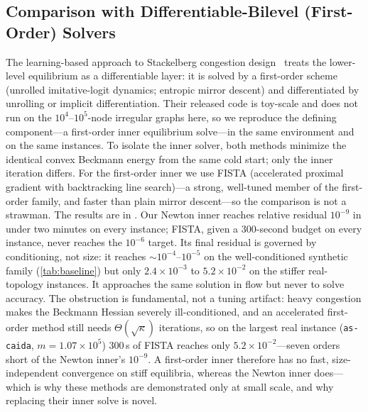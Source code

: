 \documentclass[ijoc]{informs3}
\begin{document}
\subsection{Comparison with Differentiable-Bilevel (First-Order) Solvers}
The learning-based approach to Stackelberg congestion design~\citep{li2022,goyal2023} treats the lower-level
equilibrium as a differentiable layer: it is solved by a first-order scheme (unrolled imitative-logit dynamics;
entropic mirror descent) and differentiated by unrolling or implicit differentiation. Their released code is
toy-scale and does not run on the $10^4$--$10^5$-node irregular graphs here, so we reproduce the defining
component---a first-order inner equilibrium solve---in the same environment and on the same instances. To
isolate the inner solver, both methods minimize the identical convex Beckmann energy from the same cold
start; only the inner iteration differs. For the first-order inner we use FISTA (accelerated proximal gradient
with backtracking line search)---a strong, well-tuned member of the first-order family, and faster than
plain mirror descent---so the comparison is not a strawman. The results are in . Our
Newton inner reaches relative residual $10^{-9}$ in under two minutes on every instance; FISTA, given a $300$-second
budget on every instance, never reaches the $10^{-6}$ target. Its final residual is governed by conditioning, not
size: it reaches ${\sim}10^{-4}$--$10^{-5}$ on the well-conditioned synthetic family (\cref{tab:baseline}) but only
$2.4\times10^{-3}$ to $5.2\times10^{-2}$ on the stiffer real-topology instances. It approaches the same
solution in flow but never to solve accuracy. The obstruction is fundamental, not a tuning artifact: heavy
congestion makes the Beckmann Hessian severely ill-conditioned, and an accelerated first-order method still needs
$\Theta(\sqrt{\kappa})$ iterations, so on the largest real instance (\texttt{as-caida}, $m=1.07\times10^5$)
$300$\,s of FISTA reaches only $5.2\times10^{-2}$---seven orders short of the Newton inner's $10^{-9}$. A first-order inner therefore has no fast, size-independent convergence on stiff
equilibria, whereas the Newton inner does---which is why these methods are demonstrated only at small
scale, and why replacing their inner solve is novel.
\end{document}
